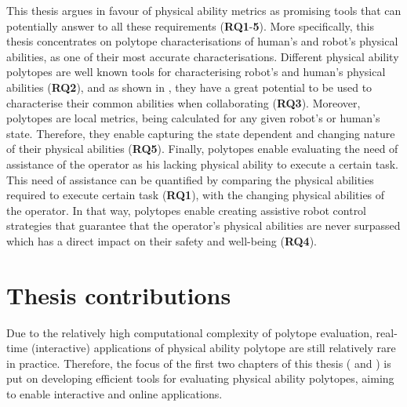 This thesis argues in favour of physical ability metrics as promising tools that can potentially answer to all these requirements (\textbf{RQ1}-\textbf{5}). More specifically, this thesis concentrates on polytope characterisations of human's and robot's physical abilities, as one of their most accurate characterisations. Different physical ability polytopes are well known tools for characterising robot's and human's physical abilities (\textbf{RQ2}), and as shown in , they have a great potential to be used to characterise their common abilities when collaborating (\textbf{RQ3}). Moreover, polytopes are local metrics, being calculated for any given robot's or human's state. Therefore, they enable capturing the state dependent and changing nature of their physical abilities (\textbf{RQ5}). Finally, polytopes enable evaluating the need of assistance of the operator as his lacking physical ability to execute a certain task. This need of assistance can be quantified by comparing the physical abilities required to execute certain task (\textbf{RQ1}), with the changing physical abilities of the operator. In that way, polytopes enable creating assistive robot control strategies that guarantee that the operator's physical abilities are never surpassed which has a direct impact on their safety and well-being (\textbf{RQ4}).

\section{Thesis contributions}

Due to the relatively high computational complexity of polytope evaluation, real-time (interactive) applications of physical ability polytope  are still relatively rare in practice. Therefore, the focus of the first two chapters of this thesis  ( and ) is put on developing efficient tools for evaluating physical ability polytopes, aiming to enable interactive and online applications.



